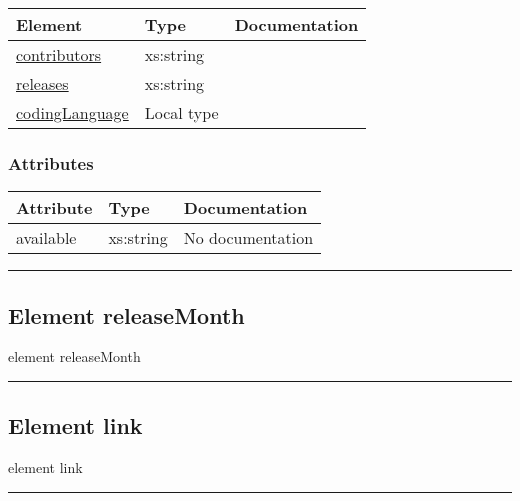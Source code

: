 \documentclass[
]{article}
\begin{document}
\begin{longtable}[]{@{}lll@{}}
\toprule
Element & Type & Documentation \\
\midrule
\endhead
\protect\hyperlink{element_contributors}{contributors} & xs:string & \\
\protect\hyperlink{element_releases}{releases} & xs:string & \\
\protect\hyperlink{element_codingLanguage}{codingLanguage} & Local type
& \\
\bottomrule
\end{longtable}

\hypertarget{attributes}{%
\subsubsection{Attributes}\label{attributes}}

\begin{longtable}[]{@{}lll@{}}
\toprule
Attribute & Type & Documentation \\
\midrule
\endhead
available & xs:string & No documentation \\
\bottomrule
\end{longtable}

\begin{center}\rule{0.5\linewidth}{0.5pt}\end{center}

\protect\hypertarget{element_releaseMonth}{}{}

\hypertarget{element-releasemonth}{%
\subsection{\texorpdfstring{Element { releaseMonth
}}{Element  releaseMonth }}\label{element-releasemonth}}

{element releaseMonth}

\begin{center}\rule{0.5\linewidth}{0.5pt}\end{center}

\protect\hypertarget{element_link}{}{}

\hypertarget{element-link}{%
\subsection{\texorpdfstring{Element { link
}}{Element  link }}\label{element-link}}

{element link}

\begin{center}\rule{0.5\linewidth}{0.5pt}\end{center}
\end{document}
